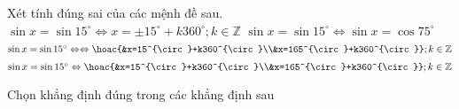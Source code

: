 \begin{ex}%
 Xét tính đúng sai của các mệnh đề  sau.
  \choiceTF
  {$\sin  x=\sin 15^{\circ}\Leftrightarrow x=\pm 15^{\circ}+k360^{\circ}; k\in\mathbb{Z}$}
  {\True  $\sin x=\sin 15^{\circ}\Leftrightarrow\sin x=\cos75^\circ$}
  {$\sin x=\sin 15^{\circ}\Leftrightarrow\Leftrightarrow\hoac{&x=15^{\circ}+k360^{\circ}\\&x=165^{\circ}+k360^{\circ}};  k\in\mathbb{Z}$}
  {\True  $\sin x=\sin 15^{\circ}\Leftrightarrow\hoac{&x=15^{\circ}+k360^{\circ}\\&x=165^{\circ}+k360^{\circ}}; k\in\mathbb{Z}$}
\end{ex}

\begin{ex}%
	 Chọn khẳng định đúng trong các khẳng định sau
\end{ex}

